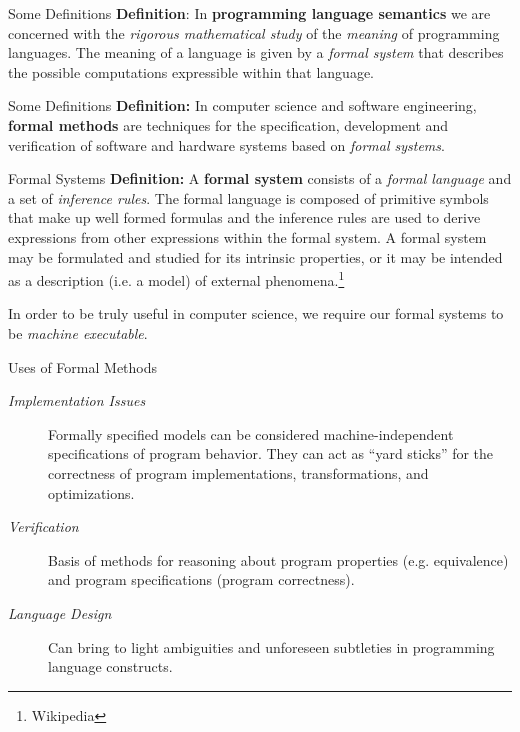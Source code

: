 \documentclass{beamer}
\begin{document}
\begin{frame}{Some Definitions}
\vspace{.1in}
{\bf Definition}: In {\bf programming language semantics} we are concerned with the {\em rigorous mathematical study} of the {\em meaning} of programming languages. The meaning of a language is given by a {\em formal system} that describes the possible computations expressible within that language.
\end{frame}

\begin{frame}{Some Definitions}
\vspace{.1in}
{\bf Definition:} In computer science and software engineering, {\bf formal methods} are  techniques for the specification, development and verification of software and hardware systems based on {\em formal systems}.

\end{frame}


\begin{frame}{Formal Systems}
\vspace{.1in}
{\bf Definition:}
A {\bf formal system} consists of a {\em formal language} and a set of  {\em inference rules}.
The formal language is composed of
primitive symbols that make up well formed formulas and the inference rules are used to derive expressions from other expressions within the formal system. A formal system may be formulated and studied for its intrinsic properties, or it may be intended as a description (i.e. a model) of external phenomena.\footnote{Wikipedia}

\vspace{.1in}
In order to be truly useful in computer science, we require our formal systems to be {\em machine executable}.

\end{frame}

\begin{frame}{Uses of Formal Methods}

\begin{description}
\item[\em Implementation Issues] Formally specified models can be considered machine-independent specifications of
program behavior. They can act as ``yard sticks'' for the correctness of program implementations, transformations, and
optimizations.
\item[\em Verification] Basis of methods for reasoning about program
properties (e.g. equivalence) and program specifications (program correctness).
\item[\em Language Design] Can bring to light ambiguities and unforeseen
subtleties in programming language constructs.
\end{description}
\end{frame}
\end{document}
